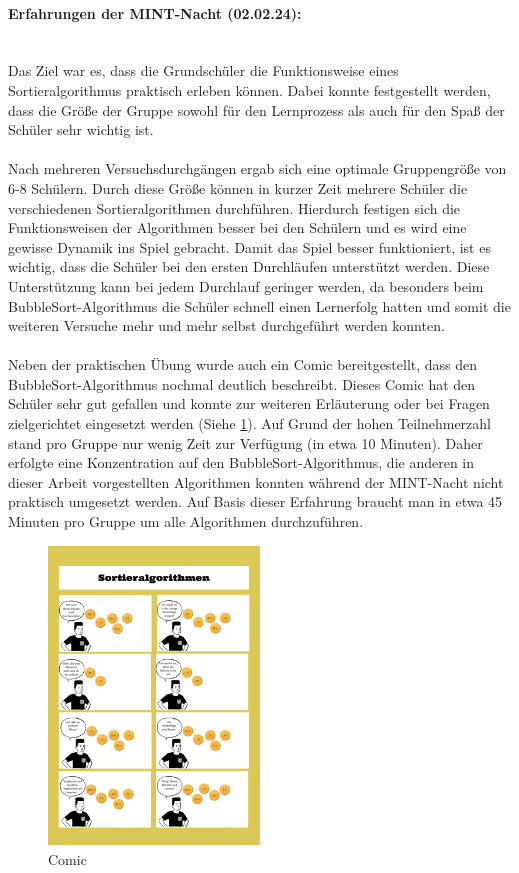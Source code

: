 \documentclass[./entry.tex]{subfiles}
\begin{document}
	\paragraph{Erfahrungen der MINT-Nacht (02.02.24):} \mbox{} \\
	Das Ziel war es, dass die Grundschüler die Funktionsweise eines Sortieralgorithmus praktisch erleben können.
	Dabei konnte festgestellt werden, dass die Größe der Gruppe sowohl für den Lernprozess als auch für den Spaß der Schüler sehr wichtig ist.
	\\\\
	Nach mehreren Versuchsdurchgängen ergab sich eine optimale Gruppengröße von 6-8 Schülern.
	Durch diese Größe können in kurzer Zeit mehrere Schüler die verschiedenen Sortieralgorithmen durchführen.
	Hierdurch festigen sich die Funktionsweisen der Algorithmen besser bei den Schülern und es wird eine gewisse Dynamik ins Spiel gebracht.
	Damit das Spiel besser funktioniert, ist es wichtig, dass die Schüler bei den ersten Durchläufen unterstützt werden.
	Diese Unterstützung kann bei jedem Durchlauf geringer werden, da besonders beim BubbleSort-Algorithmus die Schüler schnell einen Lernerfolg hatten und somit die weiteren Versuche mehr und mehr selbst durchgeführt werden konnten.
\\\\
	Neben der praktischen Übung wurde auch ein Comic bereitgestellt, dass den BubbleSort-Algorithmus nochmal deutlich beschreibt.
	Dieses Comic hat den Schüler sehr gut gefallen und konnte zur weiteren Erläuterung oder bei Fragen zielgerichtet eingesetzt werden (Siehe \ref{fig:comic}).
	Auf Grund der hohen Teilnehmerzahl stand pro Gruppe nur wenig Zeit zur Verfügung (in etwa 10 Minuten).
	Daher erfolgte eine Konzentration auf den BubbleSort-Algorithmus, die anderen in dieser Arbeit vorgestellten Algorithmen konnten während der MINT-Nacht nicht praktisch umgesetzt werden.
	Auf Basis dieser Erfahrung braucht man in etwa 45 Minuten pro Gruppe um alle Algorithmen durchzuführen.
	\begin{figure}[h]
			\includegraphics[width=0.5\textwidth]{assets/comic.PNG}
			\caption{Comic}
			\label{fig:comic}
	\end{figure}
\end{document}
